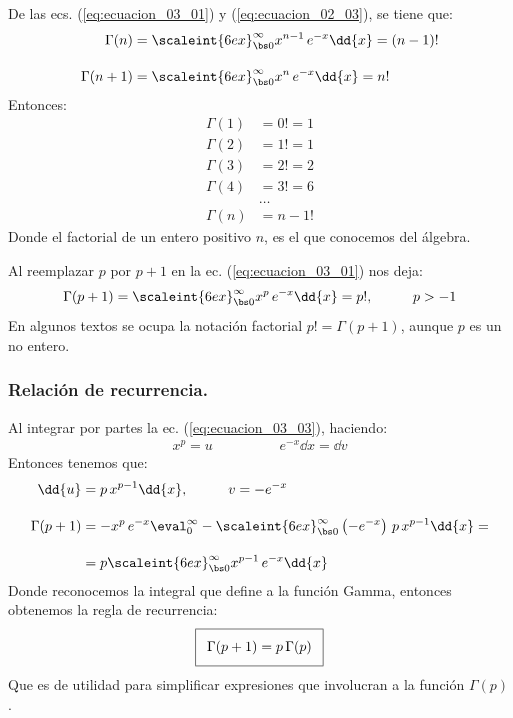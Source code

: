 De las ecs. (\ref{eq:ecuacion_03_01}) y (\ref{eq:ecuacion_02_03}), se tiene que:
\begin{align}
\begin{aligned}
\Gamma (n) &= \scaleint{6ex}_{\bs 0}^{\infty} x^{n-1} \, e^{-x} \dd{x} = (n -1)! \\[1em]
\Gamma (n+1) &= \scaleint{6ex}_{\bs 0}^{\infty} x^{n} \, e^{-x} \dd{x} = n!
\end{aligned}
\label{eq:ecuacion_03_02}
\end{align}
Entonces:
\begin{align*}
\Gamma (1) &= 0! = 1 \\
\Gamma (2) &= 1! = 1 \\
\Gamma (3) &= 2! = 2 \\
\Gamma (4) &= 3! = 6 \\
&\ldots \\
\Gamma (n) &= n-1!
\end{align*}
Donde el factorial de un entero positivo $n$, es el que conocemos del álgebra.
\par
Al reemplazar $p$ por $p+1$ en la ec. (\ref{eq:ecuacion_03_01}) nos deja:
\begin{align}
\Gamma (p+1) = \scaleint{6ex}_{\bs 0}^{\infty} x^{p} \, e^{-x} \dd{x} = p!, \hspace{1cm} p > -1
\label{eq:ecuacion_03_03}
\end{align}
En algunos textos se ocupa la notación factorial $p! = \Gamma (p + 1)$, aunque $p$ es un no entero.

\subsubsection{Relación de recurrencia.}

Al integrar por partes la ec. (\ref{eq:ecuacion_03_03}), haciendo:
\begin{align*}
x^{p} =  u \hspace{2cm} e^{-x} \dd{x} =  \dd{v}
\end{align*}
Entonces tenemos que:
\begin{align*}
\dd{u} &= p \, x^{p-1} \dd{x}, \hspace{1cm} v = - e^{-x} \\[1em]
\Gamma (p+1) &= -x^{p} \, e^{-x} \displaystyle \eval_{0}^{\infty} - \displaystyle \scaleint{6ex}_{\bs 0}^{\infty} \left(-e^{-x} \right) \, p \, x^{p-1} \dd{x} = \\[1em]
&= p \displaystyle \scaleint{6ex}_{\bs 0}^{\infty} x^{p-1} \, e^{-x} \dd{x}
\end{align*}
Donde reconocemos la integral que define a la función Gamma, entonces obtenemos la regla de recurrencia:  
\begin{align}\addtolength{\fboxsep}{5pt}\boxed{
\Gamma (p + 1) = p \, \Gamma (p)}
\label{eq:ecuacion_03_04}
\end{align}
Que es de utilidad para simplificar expresiones que involucran a la función $\Gamma (p)$.

